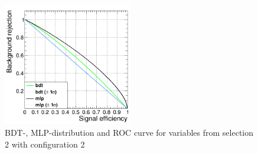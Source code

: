\documentclass[11pt]{scrartcl}
\begin{document}
\begin{figure}[H]
\begin{minipage}{.5\textwidth}
	  \label{fig:distr_s2_config2_mlp}
	\end{minipage}
	\centering
	\includegraphics[width=0.5\textwidth]{figures/MVA/select2/config2/FOM_selection2_nL7_nT800_mD3_nC20.png}
	\caption{BDT-, MLP-distribution and ROC curve for variables from selection 2 with configuration 2}
	 \label{fig:ROC_s2_config2}	
	\end{figure}
	
\end{document}
